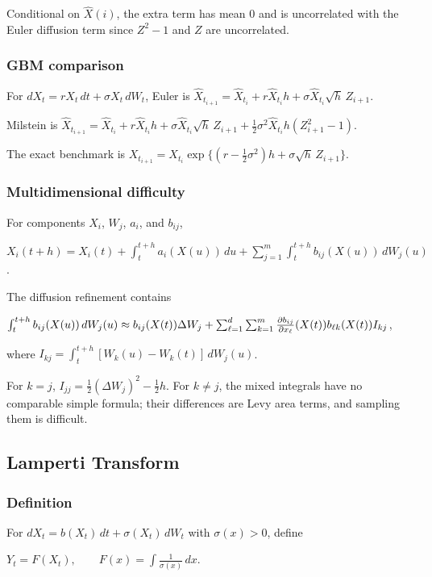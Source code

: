 Conditional on $\hat X(i)$, the extra term has mean $0$ and is uncorrelated with the Euler diffusion term since $Z^2-1$ and $Z$ are uncorrelated.

\subsubsection*{GBM comparison}

For $dX_t=rX_t\,dt+\sigma X_t\,dW_t$, Euler is
$\hat X_{t_{i+1}}=\hat X_{t_i}+r\hat X_{t_i}h+\sigma\hat X_{t_i}\sqrt h\,Z_{i+1}$.

Milstein is
$\hat X_{t_{i+1}}=\hat X_{t_i}+r\hat X_{t_i}h+\sigma\hat X_{t_i}\sqrt h\,Z_{i+1}+\frac12\sigma^2\hat X_{t_i}h(Z_{i+1}^2-1)$.

The exact benchmark is
$X_{t_{i+1}}=X_{t_i}\exp\{(r-\frac12\sigma^2)h+\sigma\sqrt h\,Z_{i+1}\}$.

\subsubsection*{Multidimensional difficulty}

For components $X_i$, $W_j$, $a_i$, and $b_{ij}$,

$X_i(t+h)=X_i(t)+\int_t^{t+h}a_i(X(u))\,du+\sum_{j=1}^m\int_t^{t+h}b_{ij}(X(u))\,dW_j(u)$.

The diffusion refinement contains

$\int_t^{t+h} b_{ij}(X(u))\,dW_j(u)\approx b_{ij}(X(t))\Delta W_j
\\+\sum_{\ell=1}^d\sum_{k=1}^m\frac{\partial b_{ij}}{\partial x_\ell}(X(t))b_{\ell k}(X(t))I_{kj}$,

where
$I_{kj}=\int_t^{t+h}[W_k(u)-W_k(t)]\,dW_j(u)$.

For $k=j$, $I_{jj}=\frac12(\Delta W_j)^2-\frac12h$. For $k\ne j$, the mixed integrals have no comparable simple formula; their differences are Levy area terms, and sampling them is difficult.

\subsection{Lamperti Transform}

\subsubsection*{Definition}

For $dX_t=b(X_t)\,dt+\sigma(X_t)\,dW_t$ with $\sigma(x)>0$, define

$Y_t=F(X_t),\qquad F(x)=\int\frac{1}{\sigma(x)}\,dx$.


